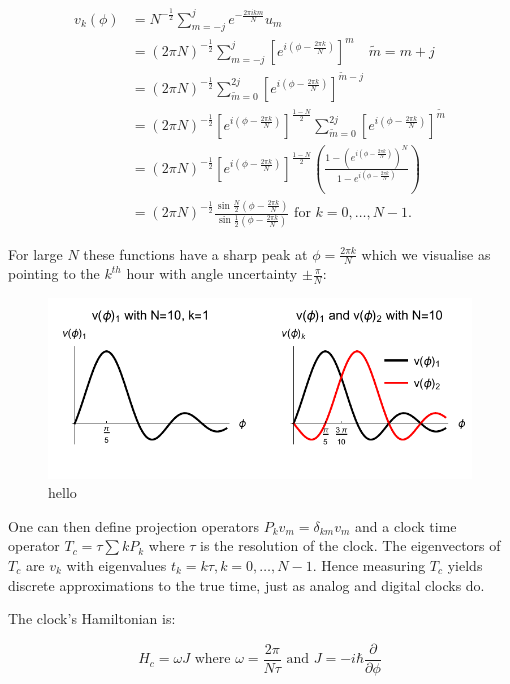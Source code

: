 \documentclass{article}
\begin{document}
\begin{align}
	v_k(\phi) &= N^{-\frac{1}{2}}\sum_{m=-j}^j e^{-\frac{2\pi ikm}{N}}u_m \label{vkexpansion}\\
		    &= (2\pi N)^{-\frac{1}{2}}\sum_{m=-j}^j [e^{i(\phi-\frac{2\pi k}{N})}]^m \quad \tilde{m} = m+j \\
		    &= (2\pi N)^{-\frac{1}{2}}\sum_{\tilde{m}=0}^{2j} [e^{i(\phi-\frac{2\pi k}{N})}]^{\tilde{m}-j} \\
		    &= (2\pi N)^{-\frac{1}{2}}[e^{i(\phi-\frac{2\pi k}{N})}]^{\frac{1-N}{2}}\sum_{\tilde{m}=0}^{2j}[e^{i(\phi-\frac{2\pi k}{N})}]^{\tilde{m}} \\
		    &= (2\pi N)^{-\frac{1}{2}}[e^{i(\phi-\frac{2\pi k}{N})}]^{\frac{1-N}{2}}\left(\frac{1-(e^{i(\phi-\frac{2\pi k}{N})})^N}{1-e^{i(\phi-\frac{2\pi k}{N})}}\right) \\
		    &= (2\pi N)^{-\frac{1}{2}}\frac{\sin{\frac{N}{2}(\phi-\frac{2\pi k}{N})}}{\sin{\frac{1}{2}(\phi-\frac{2\pi k}{N})}} \text{ for } k = 0,\dots,N-1.
\end{align}

\noindent For large $N$ these functions have a sharp peak at $\phi = \frac{2\pi k}{N}$ which we visualise as pointing to the $k^{th}$ hour with angle uncertainty $\pm \frac{\pi}{N}$:

\begin{figure}[ht]
\centering
\includegraphics{plot1.pdf}
\caption{hello}
\end{figure}

\noindent One can then define projection operators $P_kv_m=\delta_{km}v_m$ and a clock time operator $T_c = \tau\sum{kP_k}$ where $\tau$ is the resolution of the clock. The eigenvectors of $T_c$ are $v_k$ with eigenvalues $t_k = k\tau, k=0,\dots,N-1$. Hence measuring $T_c$ yields discrete approximations to the true time, just as analog and digital clocks do. 

\noindent The clock's Hamiltonian is:

\begin{equation}
	H_c = \omega J \text{ where } \omega = \frac{2\pi}{N\tau} \text{ and } J=-i\hbar \frac{\partial}{\partial\phi}
	\label{clockhamiltonian}
\end{equation}
\end{document}
